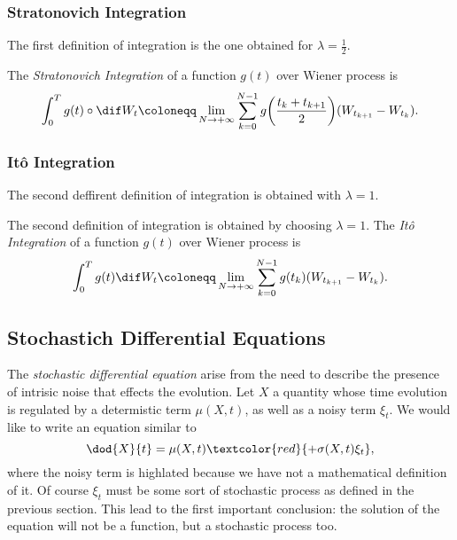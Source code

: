 \subsubsection{Stratonovich Integration}
The first definition of integration is the one obtained for \(\lambda=\frac12\).
\begin{Definition}
  The \emph{Stratonovich Integration} of a function \(g{(t)}\) over Wiener process is
  \[\int_0^T g{(t)}\circ\dif W_t \coloneqq \lim_{N\to+\infty} \sum_{k=0}^{N-1}g{\left(\frac{t_{k}+t_{k+1}}{2}\right)}(W_{t_{k+1}}-W_{t_k}).\]
\end{Definition}

\subsubsection{Itô Integration}
The second deffirent definition of integration is obtained with \(\lambda=1\).
\begin{Definition}
  The second definition of integration is obtained by choosing \(\lambda=1\).
  The \emph{Itô Integration} of a function \(g{(t)}\) over Wiener process is
  \[\int_0^T g{(t)}\dif W_t \coloneqq \lim_{N\to+\infty} \sum_{k=0}^{N-1}g{(t_k)}(W_{t_{k+1}}-W_{t_k}).\]
\end{Definition}

\subsection{Stochastich Differential Equations}
The \emph{stochastic differential equation} arise from the need to describe the
presence of intrisic noise that effects the evolution. Let \(X\) a quantity whose
time evolution is regulated by a determistic term \(\mu{(X,t)}\), as well as a noisy
term \(\xi_t\). We would like to write an equation similar to
\[\dod{X}{t} = \mu{(X,t)} \textcolor{red}{+ \sigma{(X,t)}\xi_t},\]
where the noisy term is highlated because we have not a mathematical definition
of it. Of course \(\xi_t\) must be some sort of stochastic process as defined in 
the previous section. This lead to the first important conclusion: the solution of the
equation will not be a function, but a stochastic process too.

